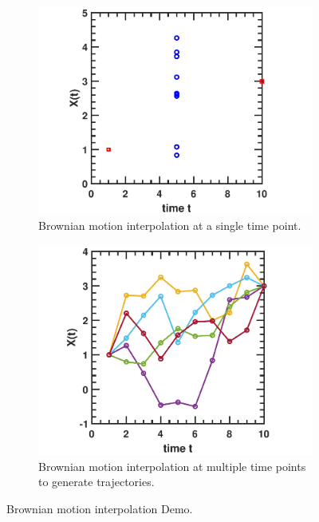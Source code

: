 \begin{refsection}
\begin{figure}[H]
	\centering
	\begin{subfigure}[b]{0.4\textwidth}
		\includegraphics[width=\textwidth]{figures/stochasticProcess/monteCarlo/BrownianInterpolationDemo1}
		\caption{Brownian motion interpolation at a single time point.}
	\end{subfigure}\quad
	\begin{subfigure}[b]{0.4\textwidth}
		\includegraphics[width=\textwidth]{figures/stochasticProcess/monteCarlo/BrownianInterpolationDemo2}
		\caption{Brownian motion interpolation at multiple time points to generate trajectories.}
	\end{subfigure}
	\caption{Brownian motion interpolation Demo.}
	\label{ch:MonteCarlo-methods--optimization:fig:BrownianMotionInterpolationDemo}
\end{figure}


\end{refsection}

